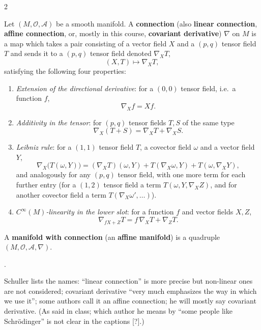 \begin{paracol}{2}
\begin{definition}\label{def:c07-connection}
Let $(M,\mathcal O,\mathcal A)$ be a smooth manifold. A \textbf{connection} (also \textbf{linear connection}, \textbf{affine connection}, or, mostly in this course, \textbf{covariant derivative}) $\nabla$ on $M$ is a map which takes a pair consisting of a vector field $X$ and a $(p,q)$ tensor field $T$ and sends it to a $(p,q)$ tensor field denoted $\nabla_XT$,
\[
  (X,T)\longmapsto\nabla_XT,
\]
satisfying the following four properties:
\begin{enumerate}
  \item \emph{Extension of the directional derivative}: for a $(0,0)$ tensor field, i.e.\ a function $f$,
        \[\nabla_Xf=Xf.\]
  \item \emph{Additivity in the tensor}: for $(p,q)$ tensor fields $T,S$ of the same type
        \[\nabla_X(T+S)=\nabla_XT+\nabla_XS.\]
  \item \emph{Leibniz rule}: for a $(1,1)$ tensor field $T$, a covector field $\omega$ and a vector field $Y$,
        \[\nabla_X\bigl(T(\omega,Y)\bigr)=(\nabla_XT)(\omega,Y)+T(\nabla_X\omega,Y)+T(\omega,\nabla_XY),\]
        and analogously for any $(p,q)$ tensor field, with one more term for each further entry (for a $(1,2)$ tensor field a term $T(\omega,Y,\nabla_XZ)$, and for another covector field a term $T(\nabla_X\omega',\dots)$).
  \item \emph{$C^\infty(M)$-linearity in the lower slot}: for a function $f$ and vector fields $X,Z$,
        \[\nabla_{fX+Z}T=f\,\nabla_XT+\nabla_ZT.\]
\end{enumerate}
A \textbf{manifold with connection} (an \textbf{affine manifold}) is a quadruple $(M,\mathcal O,\mathcal A,\nabla)$.
\end{definition}
.
\begin{coursenote}[Names]
Schuller lists the names: ``linear connection'' is more precise but non-linear ones are not considered; covariant derivative ``very much emphasizes the way in which we use it''; some authors call it an affine connection; he will mostly say covariant derivative. (As said in class; which author he means by ``some people like Schr\"odinger'' is not clear in the captions [?].)
\end{coursenote}


\end{paracol}
